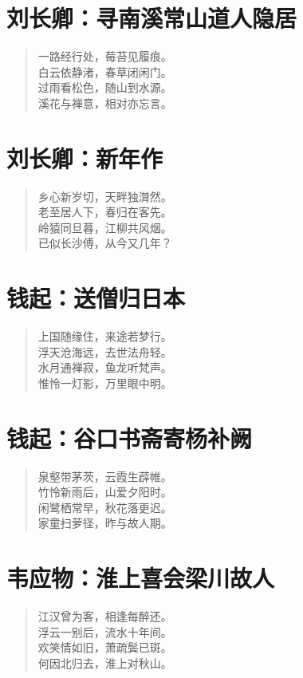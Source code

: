 \documentclass[12pt,oneside]{book}
\newenvironment{shici}{%
\begin{verse}\centering\yanti\large\hspace{12pt}}{\end{verse}}
\begin{document}
\begin{common-format}
\chapter{刘长卿：寻南溪常山道人隐居}
\begin{shici}
一路经行处，莓苔见履痕。\\
白云依静渚，春草闭闲门。\\
过雨看松色，随山到水源。\\
溪花与禅意，相对亦忘言。
\end{shici}

\chapter{刘长卿：新年作}
\begin{shici}
乡心新岁切，天畔独潸然。\\
老至居人下，春归在客先。\\
岭猿同旦暮，江柳共风烟。\\
已似长沙傅，从今又几年？
\end{shici}

\chapter{钱起：送僧归日本}
\begin{shici}
上国随缘住，来途若梦行。\\
浮天沧海远，去世法舟轻。\\
水月通禅寂，鱼龙听梵声。\\
惟怜一灯影，万里眼中明。
\end{shici}

\chapter{钱起：谷口书斋寄杨补阙}
\begin{shici}
泉壑带茅茨，云霞生薜帷。\\
竹怜新雨后，山爱夕阳时。\\
闲鹭栖常早，秋花落更迟。\\
家童扫萝径，昨与故人期。
\end{shici}

\chapter{韦应物：淮上喜会梁川故人}
\begin{shici}
江汉曾为客，相逢每醉还。\\
浮云一别后，流水十年间。\\
欢笑情如旧，萧疏鬓已斑。\\
何因北归去，淮上对秋山。
\end{shici}


\end{common-format}
\end{document}
